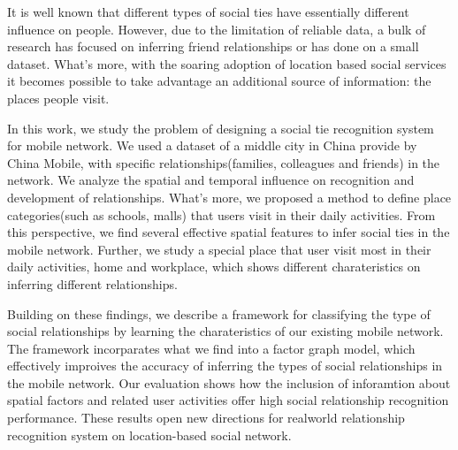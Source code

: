 \begin{eabstract}
It is well known that different types of social ties have essentially different influence on people. However, due to the limitation of reliable data, a bulk of research has focused on inferring friend relationships or has done on a small dataset. What's more, with the soaring adoption of location based social services it becomes possible to take advantage an additional source of information: the places people visit.

In this work, we study the problem of designing a social tie recognition system for mobile network. We used a dataset of a middle city in China provide by China Mobile, with specific relationships(families, colleagues and friends) in the network. We analyze the spatial and temporal influence on recognition and development of relationships. What's more, we proposed a method to define place categories(such as schools, malls) that users visit in their daily activities. From this perspective, we find several effective spatial features to infer social ties in the mobile network. Further, we study a special place that user visit most in their daily activities, home and workplace, which shows different charateristics on inferring different relationships.

Building on these findings, we describe a framework for classifying the type of social relationships by learning the charateristics of our existing mobile network. The framework incorparates what we find into a factor graph model, which effectively improives the accuracy of inferring the types of social relationships in the mobile network.  Our evaluation shows how the inclusion of inforamtion about spatial factors and related user activities offer high social relationship recognition performance. These results open new directions for realworld relationship recognition system on location-based social network.
\end{eabstract}